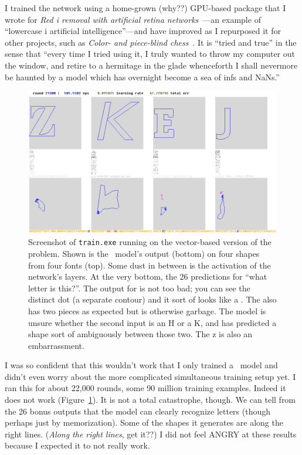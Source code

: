 \documentclass[twocolumn]{amsart}
\begin{document}
\newcommand\nan{\textsf{NaN}}
\renewcommand\inf{\textsf{inf}}

I trained the network using a home-grown (why??) GPU-based package
that I wrote for {\em Red i removal with artificial retina
  networks}~\cite{murphy2015redi}---an example of ``lowercase i
artificial intelligence''---and have improved as I repurposed it for
other projects, such as {\em Color- and piece-blind
  chess}~\cite{murphy2019blind}. It is ``tried and true'' in the
sense that ``every time I tried using it, I truly wanted to throw
my computer out the window, and retire to a hermitage in the glade
whenceforth I shall nevermore be haunted by a model which has
overnight become a sea of \inf{}s and \nan{}s.''

\begin{figure}[ht]
\includegraphics[width=0.9 \linewidth]{trainingvector}
\caption{ Screenshot of {\tt train.exe} running on the vector-based
  version of the problem. Shown is the \makelowercase\ model's output
  (bottom) on four shapes from four fonts (top). Some dust in between
  is the activation of the network's layers. At the very bottom, the
  26 predictions for ``what letter is this?''. The output for
   is not too bad; you can see the distinct dot (a
  separate contour) and it sort of looks like a . The
   also has two pieces as expected but is otherwise
  garbage. The model is unsure whether the second input is an H
  or a K, and has predicted a shape sort of ambiguously between those
  two. The \lowercase{z} is also an embarrassment.
} \label{fig:trainingvector}
\end{figure}

I was so {\tiny confident} that this wouldn't work that I only trained
a \makelowercase\ model and didn't even worry about the more
complicated simultaneous training setup yet. I ran this for about
22,000 rounds, some 90 million training examples. Indeed it does not
work (Figure~\ref{fig:trainingvector}). It is not a total catastrophe,
though. We can tell from the 26 bonus outputs that the model can
clearly recognize letters (though perhaps just by memorization). Some
of the shapes it generates are along the right lines. ({\em Along the
  right lines}, get it??) I did not feel ANGRY at these results because
I expected it to not really work.
\end{document}

